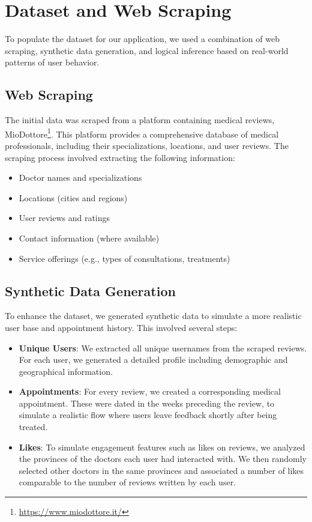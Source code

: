 \chapter{Dataset and Web Scraping}
To populate the dataset for our application, we used a combination of web scraping, synthetic data generation, and logical inference based on real-world patterns of user behavior.

\section{Web Scraping}
The initial data was scraped from a platform containing medical reviews, MioDottore\footnote{\url{https://www.miodottore.it/}}. This platform provides a comprehensive database of medical professionals, including their specializations, locations, and user reviews. The scraping process involved extracting the following information:
\begin{itemize}
    \item Doctor names and specializations
    \item Locations (cities and regions)
    \item User reviews and ratings
    \item Contact information (where available)
    \item Service offerings (e.g., types of consultations, treatments)
\end{itemize}

\section{Synthetic Data Generation}
To enhance the dataset, we generated synthetic data to simulate a more realistic user base and appointment history.
This involved several steps:
\begin{itemize}
    \item \textbf{Unique Users}: We extracted all unique usernames from the scraped reviews. For each user, we generated a detailed profile including demographic and geographical information.
    \item \textbf{Appointments}: For every review, we created a corresponding medical appointment. These were dated in the weeks preceding the review, to simulate a realistic flow where users leave feedback shortly after being treated.
    \item \textbf{Likes}: To simulate engagement features such as likes on reviews, we analyzed the provinces of the doctors each user had interacted with. We then randomly selected other doctors in the same provinces and associated a number of likes comparable to the number of reviews written by each user.
\end{itemize}
    

